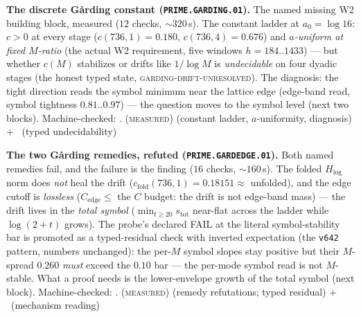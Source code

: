 \par\smallskip\noindent\textbf{The discrete G\aa rding constant
(\texttt{PRIME.GARDING.01}).}
The named missing W2 building block, measured ($12$ checks,
${\sim}320$\,s).  The constant ladder at $a_0=\log16$: $c>0$ at
every stage ($c(736,1)=0.180$, $c(736,4)=0.676$) and
\emph{$a$-uniform at fixed $M$-ratio} (the actual W2 requirement,
five windows $h=184..1433$) --- but whether $c(M)$ stabilizes or
drifts like $1/\log M$ is \emph{undecidable} on four dyadic stages
(the honest typed state, \textsc{garding-drift-unresolved}).  The
diagnosis: the tight direction reads the symbol minimum near the
lattice edge (edge-band read, symbol tightness $0.81..0.97$) --- the
question moves to the symbol level (next two blocks).
Machine-checked: .
(\textsc{measured}) (constant ladder, $a$-uniformity, diagnosis)
$+$ \mC\ (typed undecidability)
\par\smallskip


\par\smallskip\noindent\textbf{The two G\aa rding remedies, refuted
(\texttt{PRIME.GARDEDGE.01}).}
Both named remedies fail, and the failure is the finding ($16$
checks, ${\sim}160$\,s).  The folded $H_{\log}$ norm does \emph{not}
heal the drift ($c_{\mathrm{fold}}(736,1)=0.18151\approx$ unfolded),
and the edge cutoff is \emph{lossless} ($C_{\mathrm{edge}}\le$ the
$C$ budget: the drift is not edge-band mass) --- the drift lives in
the \emph{total symbol} ($\min_{t\ge20}s_{\mathrm{tot}}$ near-flat
across the ladder while $\log(2+t)$ grows).  The probe's declared
FAIL at the literal symbol-stability bar is promoted as a
typed-residual check with inverted expectation (the \texttt{v642}
pattern, numbers unchanged): the per-$M$ symbol slopes stay positive
but their $M$-spread $0.260$ \emph{must} exceed the $0.10$ bar ---
the per-mode symbol read is not $M$-stable.  What a proof needs is
the lower-envelope growth of the total symbol (next block).
Machine-checked: .
(\textsc{measured}) (remedy refutations; typed residual) $+$ \mC\
(mechanism reading)
\par\smallskip


